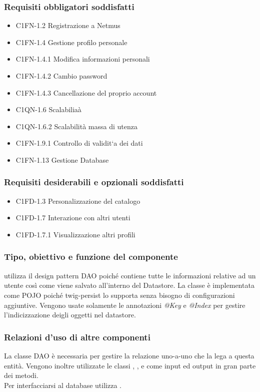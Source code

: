 \subsubsection*{Requisiti obbligatori soddisfatti}
\begin{itemize}
    \item C1FN-1.2 Registrazione a Netmus
    \item C1FN-1.4 Gestione profilo personale
    \item C1FN-1.4.1 Modifica informazioni personali
    \item C1FN-1.4.2 Cambio password
    \item C1FN-1.4.3 Cancellazione del proprio account
    \item C1QN-1.6 Scalabilia\`a
    \item C1QN-1.6.2 Scalabilit\`a massa di utenza
    \item C1FN-1.9.1 Controllo di validit`a dei dati
    \item C1FN-1.13 Gestione Database
\end{itemize}
\subsubsection*{Requisiti desiderabili e opzionali soddisfatti}
\begin{itemize}
    \item C1FD-1.3 Personalizzazione del catalogo
    \item C1FD-1.7 Interazione con altri utenti
    \item C1FD-1.7.1 Visualizzazione altri profili
\end{itemize}
\subsubsection*{Tipo, obiettivo e funzione del componente}
 utilizza il design pattern DAO poich\'e contiene tutte le
informazioni relative ad un utente cos\`i come viene salvato all'interno del
Datastore. La classe \`e implementata come POJO poich\'e twig-persist lo
supporta senza bisogno di configurazioni aggiuntive. Vengono usate solamente
le annotazioni \emph{@Key} e \emph{@Index} per gestire l'indicizzazione
deigli oggetti nel datastore.\\
\subsubsection*{Relazioni d'uso di altre componenti} La classe DAO  \`e necessaria per gestire la relazione
uno-a-uno che la lega a questa entit\`a. Vengono inoltre utilizzate le classi
, ,  e  come
input ed output in gran parte dei metodi.\\
Per interfacciarsi al database utilizza . 
